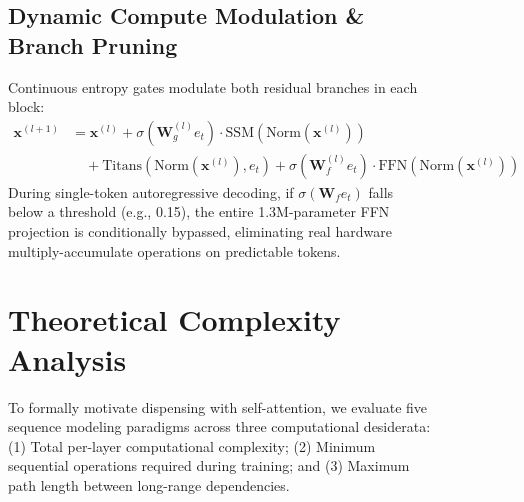 \documentclass[10pt,twocolumn,letterpaper]{article}
\begin{document}
\begin{figure}[t]
\subsection{Dynamic Compute Modulation \& Branch Pruning}
Continuous entropy gates modulate both residual branches in each block:
\begin{align}
    \mathbf{x}^{(l+1)} &= \mathbf{x}^{(l)} + \sigma(\mathbf{W}_g^{(l)} e_t) \cdot \text{SSM}(\text{Norm}(\mathbf{x}^{(l)})) \nonumber \\
    &\quad + \text{Titans}(\text{Norm}(\mathbf{x}^{(l)}), e_t) + \sigma(\mathbf{W}_f^{(l)} e_t) \cdot \text{FFN}(\text{Norm}(\mathbf{x}^{(l)}))
\end{align}
During single-token autoregressive decoding, if $\sigma(\mathbf{W}_f e_t)$ falls below a threshold (e.g., 0.15), the entire 1.3M-parameter FFN projection is conditionally bypassed, eliminating real hardware multiply-accumulate operations on predictable tokens.

\section{Theoretical Complexity Analysis}
\label{sec:complexity}

To formally motivate dispensing with self-attention, we evaluate five sequence modeling paradigms across three computational desiderata: (1) Total per-layer computational complexity; (2) Minimum sequential operations required during training; and (3) Maximum path length between long-range dependencies.


\end{figure}
\end{document}

